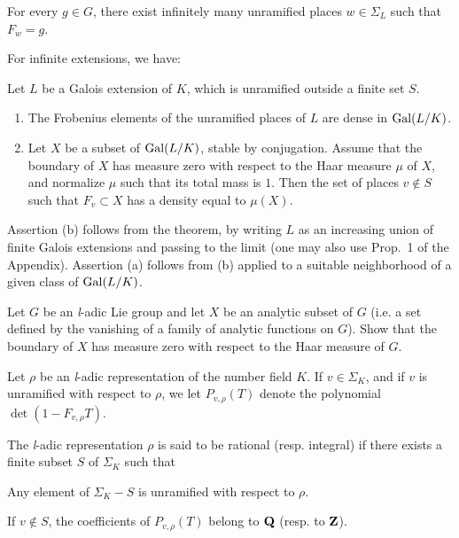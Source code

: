 \begin{corollary}\label{cor:I.2.2.1}
For every $g \in G$, there exist infinitely many unramified places
$w \in \Sigma_L$ such that $F_w = g$.
\end{corollary}

For infinite extensions, we have:

\begin{corollary}\label{cor:I.2.2.2}
Let $L$ be a Galois extension of $K$, which is unramified outside a
finite set $S$.
\begin{enumerate}[label=\alph*),leftmargin=2.2em,itemsep=0.15ex,topsep=0.4ex]
\item The Frobenius elements of the unramified places of $L$ are dense
in $\mathrm{Gal}(L/K)$.
\item Let $X$ be a subset of $\mathrm{Gal}(L/K)$, stable by conjugation.
Assume that the boundary of $X$ has measure zero with respect to the
Haar measure $\mu$ of $X$, and normalize $\mu$ such that its total
mass is $1$.  Then the set of places $v \notin S$ such that
$F_v \subset X$ has a density equal to $\mu(X)$.
\end{enumerate}
\end{corollary}

Assertion (b) follows from the theorem, by writing $L$ as an
increasing union of finite Galois extensions and passing to the limit
(one may also use Prop.~1 of the Appendix).  Assertion (a) follows
from (b) applied to a suitable neighborhood of a given class of
$\mathrm{Gal}(L/K)$.


Let $G$ be an \textit{l}-adic Lie group and let $X$ be an analytic
subset of $G$ (i.e. a set defined by the vanishing of a family of
analytic functions on $G$).  Show that the boundary of $X$ has measure
zero with respect to the Haar measure of $G$.


Let $\rho$ be an \textit{l}-adic representation of the number field
$K$.  If $v \in \Sigma_K$, and if $v$ is unramified with respect to
$\rho$, we let $P_{v,\rho}(T)$ denote the polynomial
$\det(1 - F_{v,\rho}T)$.

\begin{dfn}
The \textit{l}-adic representation $\rho$ is said to be rational
(resp. integral) if there exists a finite subset $S$ of $\Sigma_K$
such that
\begin{alist}
\item Any element of $\Sigma_K - S$ is unramified with respect to
$\rho$.
\item If $v \notin S$, the coefficients of $P_{v,\rho}(T)$ belong to
$\mathbf{Q}$ (resp. to $\mathbf{Z}$).
\end{alist}
\end{dfn}

